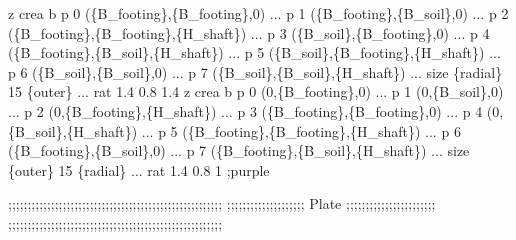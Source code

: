 \documentclass[a4paper, nobind]{templates/ociamthesis}
\newenvironment{Shaded}{\begin{snugshade}}{\end{snugshade}}
\newcommand{\SpecialCharTok}[1]{\textcolor[rgb]{0.00,0.00,0.00}{#1}}
\newcommand{\StringTok}[1]{\textcolor[rgb]{0.31,0.60,0.02}{#1}}
\renewenvironment{Shaded}
{
  \vspace{10pt}%
  \begin{snugshade}%
}{%
  \end{snugshade}%
  \vspace{8pt}%
}
\begin{document}
\begin{Shaded}
\begin{Highlighting}[]
\StringTok{z crea b p 0 (}\SpecialCharTok{\{B\_footing\}}\StringTok{,}\SpecialCharTok{\{B\_footing\}}\StringTok{,0) ...}
\StringTok{         p 1 (}\SpecialCharTok{\{B\_footing\}}\StringTok{,}\SpecialCharTok{\{B\_soil\}}\StringTok{,0) ...}
\StringTok{         p 2 (}\SpecialCharTok{\{B\_footing\}}\StringTok{,}\SpecialCharTok{\{B\_footing\}}\StringTok{,}\SpecialCharTok{\{H\_shaft\}}\StringTok{) ...}
\StringTok{         p 3 (}\SpecialCharTok{\{B\_soil\}}\StringTok{,}\SpecialCharTok{\{B\_footing\}}\StringTok{,0) ...}
\StringTok{         p 4 (}\SpecialCharTok{\{B\_footing\}}\StringTok{,}\SpecialCharTok{\{B\_soil\}}\StringTok{,}\SpecialCharTok{\{H\_shaft\}}\StringTok{) ...}
\StringTok{         p 5 (}\SpecialCharTok{\{B\_soil\}}\StringTok{,}\SpecialCharTok{\{B\_footing\}}\StringTok{,}\SpecialCharTok{\{H\_shaft\}}\StringTok{) ...}
\StringTok{         p 6 (}\SpecialCharTok{\{B\_soil\}}\StringTok{,}\SpecialCharTok{\{B\_soil\}}\StringTok{,0) ...}
\StringTok{         p 7 (}\SpecialCharTok{\{B\_soil\}}\StringTok{,}\SpecialCharTok{\{B\_soil\}}\StringTok{,}\SpecialCharTok{\{H\_shaft\}}\StringTok{) ...}
\StringTok{         size }\SpecialCharTok{\{radial\}}\StringTok{ 15 }\SpecialCharTok{\{outer\}}\StringTok{ ...}
\StringTok{         rat 1.4 0.8 1.4}
\StringTok{           }
\StringTok{z crea b p 0 (0,}\SpecialCharTok{\{B\_footing\}}\StringTok{,0) ...}
\StringTok{         p 1 (0,}\SpecialCharTok{\{B\_soil\}}\StringTok{,0) ...}
\StringTok{         p 2 (0,}\SpecialCharTok{\{B\_footing\}}\StringTok{,}\SpecialCharTok{\{H\_shaft\}}\StringTok{) ...}
\StringTok{         p 3 (}\SpecialCharTok{\{B\_footing\}}\StringTok{,}\SpecialCharTok{\{B\_footing\}}\StringTok{,0) ...}
\StringTok{         p 4 (0,}\SpecialCharTok{\{B\_soil\}}\StringTok{,}\SpecialCharTok{\{H\_shaft\}}\StringTok{) ...}
\StringTok{         p 5 (}\SpecialCharTok{\{B\_footing\}}\StringTok{,}\SpecialCharTok{\{B\_footing\}}\StringTok{,}\SpecialCharTok{\{H\_shaft\}}\StringTok{) ...}
\StringTok{         p 6 (}\SpecialCharTok{\{B\_footing\}}\StringTok{,}\SpecialCharTok{\{B\_soil\}}\StringTok{,0) ...}
\StringTok{         p 7 (}\SpecialCharTok{\{B\_footing\}}\StringTok{,}\SpecialCharTok{\{B\_soil\}}\StringTok{,}\SpecialCharTok{\{H\_shaft\}}\StringTok{) ...}
\StringTok{         size }\SpecialCharTok{\{outer\}}\StringTok{ 15 }\SpecialCharTok{\{radial\}}\StringTok{ ...}
\StringTok{         rat 1.4 0.8 1 ;purple}

\StringTok{;;;;;;;;;;;;;;;;;;;;;;;;;;;;;;;;;;;;;;;;;;;;;;;;;;;;;;;}
\StringTok{;;;;;;;;;;;;;;;;;;;;   Plate    ;;;;;;;;;;;;;;;;;;;;;;;}
\StringTok{;;;;;;;;;;;;;;;;;;;;;;;;;;;;;;;;;;;;;;;;;;;;;;;;;;;;;;;}


\end{Highlighting}
\end{Shaded}
\end{document}
